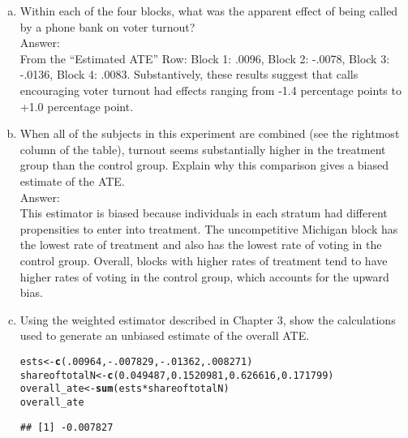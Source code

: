 \documentclass[11pt,notitlepage]{article}\usepackage[]{graphicx}\usepackage[]{color}
\makeatletter
\newcommand{\hlnum}[1]{\textcolor[rgb]{0.686,0.059,0.569}{#1}}%
\newcommand{\hlopt}[1]{\textcolor[rgb]{0,0,0}{#1}}%
\newcommand{\hlstd}[1]{\textcolor[rgb]{0.345,0.345,0.345}{#1}}%
\newcommand{\hlkwb}[1]{\textcolor[rgb]{0.69,0.353,0.396}{#1}}%
\newcommand{\hlkwd}[1]{\textcolor[rgb]{0.737,0.353,0.396}{\textbf{#1}}}%
\newenvironment{kframe}{%
 \def\at@end@of@kframe{}%
 \ifinner\ifhmode%
  \def\at@end@of@kframe{\end{minipage}}%
  \begin{minipage}{\columnwidth}%
 \fi\fi%
 \def\FrameCommand##1{\hskip\@totalleftmargin \hskip-\fboxsep
 \colorbox{shadecolor}{##1}\hskip-\fboxsep
     \hskip-\linewidth \hskip-\@totalleftmargin \hskip\columnwidth}%
 \MakeFramed {\advance\hsize-\width
   \@totalleftmargin\z@ \linewidth\hsize
   \@setminipage}}%
 {\par\unskip\endMakeFramed%
 \at@end@of@kframe}
\newenvironment{knitrout}{}{} %
\makeatother
\begin{document}
\begin{enumerate}[a)]
\item Within each of the four blocks, what was the apparent effect of being called by a phone bank on voter turnout?  \\
Answer:\\
From the ``Estimated ATE'' Row: Block 1: .0096, Block 2: -.0078, Block 3: -.0136, Block 4: .0083.  Substantively, these results suggest that calls encouraging voter turnout had effects ranging from -1.4 percentage points to +1.0 percentage point.
\item When all of the subjects in this experiment are combined (see the rightmost column of the table), turnout seems substantially higher in the treatment group than the control group.  Explain why this comparison gives a biased estimate of the ATE.\\
Answer:\\
This estimator is biased because individuals in each stratum had different propensities to enter into treatment. The uncompetitive Michigan block has the lowest rate of treatment and also has the lowest rate of voting in the control group. Overall, blocks with higher rates of treatment tend to have higher rates of voting in the control group, which accounts for the upward bias.
\item Using the weighted estimator described in Chapter 3, show the calculations used to generate an unbiased estimate of the overall ATE. 
\begin{knitrout}
\color{fgcolor}\begin{kframe}
\begin{alltt}
\hlstd{ests} \hlkwb{<-} \hlkwd{c}\hlstd{(}\hlnum{.00964}\hlstd{,} \hlopt{-}\hlnum{.007829}\hlstd{,} \hlopt{-}\hlnum{.01362}\hlstd{,}\hlnum{.008271}\hlstd{)}
\hlstd{shareoftotalN} \hlkwb{<-} \hlkwd{c}\hlstd{(}\hlnum{0.049487}\hlstd{,} \hlnum{0.1520981}\hlstd{,} \hlnum{0.626616}\hlstd{,} \hlnum{0.171799}\hlstd{)}
\hlstd{overall_ate} \hlkwb{<-}\hlkwd{sum}\hlstd{(ests}\hlopt{*}\hlstd{shareoftotalN)}
\hlstd{overall_ate}
\end{alltt}
\begin{verbatim}
## [1] -0.007827
\end{verbatim}
\end{kframe}
\end{knitrout}


\end{enumerate}
\end{document}
